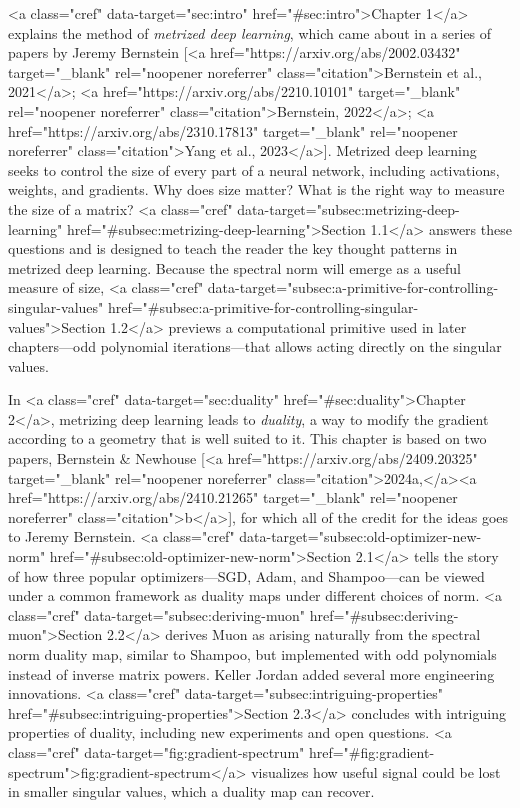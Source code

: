 <a class="cref" data-target="sec:intro" href="#sec:intro">Chapter 1</a> explains the method of \textit{metrized deep learning}, which came about in a series of papers by Jeremy Bernstein [<a href="https://arxiv.org/abs/2002.03432" target="_blank" rel="noopener noreferrer" class="citation">Bernstein et al., 2021</a>; <a href="https://arxiv.org/abs/2210.10101" target="_blank" rel="noopener noreferrer" class="citation">Bernstein, 2022</a>; <a href="https://arxiv.org/abs/2310.17813" target="_blank" rel="noopener noreferrer" class="citation">Yang et al., 2023</a>]. Metrized deep learning seeks to control the size of every part of a neural network, including activations, weights, and gradients. Why does size matter? What is the right way to measure the size of a matrix? <a class="cref" data-target="subsec:metrizing-deep-learning" href="#subsec:metrizing-deep-learning">Section 1.1</a> answers these questions and is designed to teach the reader the key thought patterns in metrized deep learning. Because the spectral norm will emerge as a useful measure of size, <a class="cref" data-target="subsec:a-primitive-for-controlling-singular-values" href="#subsec:a-primitive-for-controlling-singular-values">Section 1.2</a> previews a computational primitive used in later chapters---odd polynomial iterations---that allows acting directly on the singular values.

In <a class="cref" data-target="sec:duality" href="#sec:duality">Chapter 2</a>, metrizing deep learning leads to \textit{duality}, a way to modify the gradient according to a geometry that is well suited to it. This chapter is based on two papers, Bernstein & Newhouse [<a href="https://arxiv.org/abs/2409.20325" target="_blank" rel="noopener noreferrer" class="citation">2024a,</a><a href="https://arxiv.org/abs/2410.21265" target="_blank" rel="noopener noreferrer" class="citation">b</a>], for which all of the credit for the ideas goes to Jeremy Bernstein. <a class="cref" data-target="subsec:old-optimizer-new-norm" href="#subsec:old-optimizer-new-norm">Section 2.1</a> tells the story of how three popular optimizers---SGD, Adam, and Shampoo---can be viewed under a common framework as duality maps under different choices of norm. <a class="cref" data-target="subsec:deriving-muon" href="#subsec:deriving-muon">Section 2.2</a> derives Muon as arising naturally from the spectral norm duality map, similar to Shampoo, but implemented with odd polynomials instead of inverse matrix powers. Keller Jordan added several more engineering innovations. <a class="cref" data-target="subsec:intriguing-properties" href="#subsec:intriguing-properties">Section 2.3</a> concludes with intriguing properties of duality, including new experiments and open questions. <a class="cref" data-target="fig:gradient-spectrum" href="#fig:gradient-spectrum">fig:gradient-spectrum</a> visualizes how useful signal could be lost in smaller singular values, which a duality map can recover.

